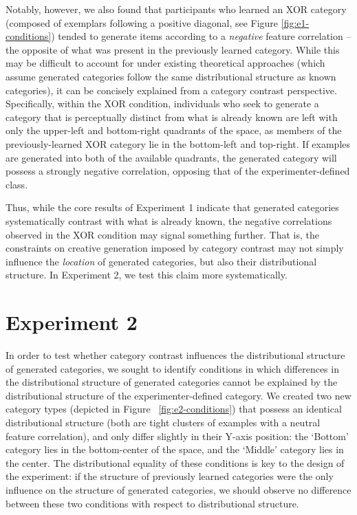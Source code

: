 \documentclass[12pt]{article}
\begin{document}
\begin{flushleft}
Notably, however, we also found that participants who learned an XOR category (composed of exemplars following a positive diagonal, see Figure \ref{fig:e1-conditions}) tended to generate items according to a {\em negative} feature correlation -- the opposite of what was present in the previously learned category. While this may be difficult to account for under existing theoretical approaches (which assume generated categories follow the same distributional structure as known categories), it can be concisely explained from a category contrast perspective. Specifically, within the XOR condition, individuals who seek to generate a category that is perceptually distinct from what is already known are left with only the upper-left and bottom-right quadrants of the space, as members of the previously-learned XOR category lie in the bottom-left and top-right. If examples are generated into both of the available quadrants, the generated category will possess a strongly negative correlation, opposing that of the experimenter-defined class.

Thus, while the core results of Experiment 1 indicate that generated categories systematically contrast with what is already known, the negative correlations observed in the XOR condition may signal something further. That is, the constraints on creative generation imposed by category contrast may not simply influence the {\em location} of generated categories, but also their distributional structure. In Experiment 2, we test this claim more systematically.


\section{Experiment 2}

In order to test whether category contrast influences the distributional structure of generated categories, we sought to identify conditions in which differences in the distributional structure of generated categories cannot be explained by the distributional structure of the experimenter-defined category. We created two new category types (depicted in Figure ~\ref{fig:e2-conditions}) that possess an identical distributional structure (both are tight clusters of examples with a neutral feature correlation), and only differ slightly in their Y-axis position: the `Bottom' category lies in the bottom-center of the space, and the `Middle' category lies in the center. The distributional equality of these conditions is key to the design of the experiment: if the structure of previously learned categories were the only influence on the structure of generated categories, we should observe no difference between these two conditions with respect to distributional structure.


\end{flushleft}
\end{document}
